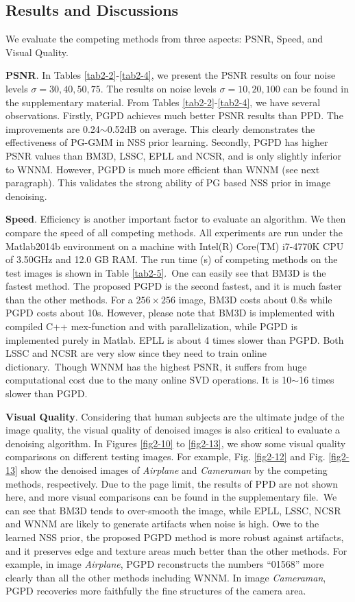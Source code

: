 \subsection{Results and Discussions}
We evaluate the competing methods from three aspects: PSNR, Speed, and Visual Quality.

\textbf{PSNR}. In Tables \ref{tab2-2}-\ref{tab2-4}, we present the PSNR results on four noise levels $\sigma=30,40,50,75$. The results on noise levels $\sigma=10,20,100$ can be found in the supplementary material. From Tables \ref{tab2-2}-\ref{tab2-4}, we have several observations. Firstly, PGPD achieves much better PSNR results than PPD. The improvements are 0.24$\sim$0.52dB on average. This clearly demonstrates the effectiveness of PG-GMM in NSS prior learning. Secondly, PGPD has higher PSNR values than BM3D, LSSC, EPLL and NCSR, and is only slightly inferior to WNNM. However, PGPD is much more efficient than WNNM (see next paragraph). This validates the strong ability of PG based NSS prior in image denoising. 

\textbf{Speed}. Efficiency is another important factor to evaluate an algorithm. We then compare the speed of all competing methods. All experiments are run under the Matlab2014b environment on a machine with Intel(R) Core(TM) i7-4770K CPU of 3.50GHz and 12.0 GB RAM. The run time (s) of competing methods on the test images is shown in Table \ref{tab2-5}.\ One can easily see that BM3D is the fastest method. The proposed PGPD is the second fastest, and it is much faster than the other methods. For a $256\times256$ image, BM3D costs about 0.8s while PGPD costs about 10s. However, please note that BM3D is implemented with compiled C++ mex-function and with parallelization, while PGPD is implemented purely in Matlab. EPLL is about 4 times slower than PGPD. Both LSSC and NCSR are very slow since they need to train online dictionary.\ Though WNNM has the highest PSNR, it suffers from huge computational cost due to the many online SVD operations. It is 10$\sim$16 times slower than PGPD. 

\textbf{Visual Quality}. Considering that human subjects are the ultimate judge of the image quality, the visual quality of denoised images is also critical to evaluate a denoising algorithm. In Figures \ref{fig2-10} to \ref{fig2-13}, we show some visual quality comparisons on different testing images. For example, Fig. \ref{fig2-12} and Fig. \ref{fig2-13} show the denoised images of \textsl{Airplane} and \textsl{Cameraman} by the competing methods, respectively. Due to the page limit, the results of PPD are not shown here, and more visual comparisons can be found in the supplementary file.\ We can see that BM3D tends to over-smooth the image, while EPLL, LSSC, NCSR and WNNM are likely to generate artifacts when noise is high. Owe to the learned NSS prior, the proposed PGPD method is more robust against artifacts, and it preserves edge and texture areas much better than the other methods. For example, in image \textsl{Airplane}, PGPD reconstructs the numbers ``01568'' more clearly than all the other methods including WNNM. In image \textsl{Cameraman}, PGPD recoveries more faithfully the fine structures of the camera area. 


